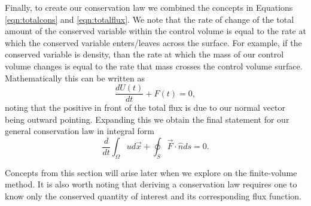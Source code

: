 Finally, to create our conservation law we combined the concepts in Equations \ref{eqn:totalcons} and \ref{eqn:totalflux}. We note that the rate of change of the total amount of the conserved variable within the control volume is equal to the rate at which the conserved variable enters/leaves across the surface. For example, if the conserved variable is density, than the rate at which the mass of our control volume changes is equal to the rate that mass crosses the control volume surface. Mathematically this can be written as
\begin{equation}
	\frac{dU(t)}{dt} + F(t) = 0,
\end{equation}
noting that the positive in front of the total flux is due to our normal vector being outward pointing. Expanding this we obtain the final statement for our general conservation law in integral form
\begin{equation}
	\label{eqn:totalcons}
	\frac{d}{dt}\int_\Omega u d\vec{x} + \oint_S \vec{F} \cdot \hat{n} ds = 0.
\end{equation}
\begin{remark}
Concepts from this section will arise later when we explore on the finite-volume method. It is also worth noting that deriving a conservation law requires one to know only the conserved quantity of interest and its corresponding flux function.
\end{remark}

